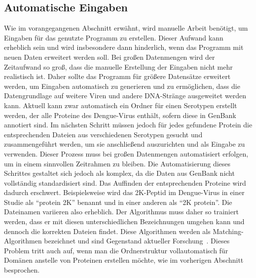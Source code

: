 \documentclass[german,version-2022-01]{uzl-thesis}
\begin{document}
\subsection{Automatische Eingaben}
Wie im vorangegangenen Abschnitt erw\"ahnt, wird manuelle Arbeit ben\"otigt, um Eingaben f\"ur das genutzte Programm zu erstellen. Dieser Aufwand kann erheblich sein und wird insbesondere dann hinderlich, wenn das Programm mit neuen Daten erweitert werden soll. Bei gro\ss{}en Datenmengen wird der Zeitaufwand so gro\ss{}, dass die manuelle Erstellung der Eingaben nicht mehr realistisch ist. Daher sollte das Programm f\"ur gr\"o\ss{}ere Datens\"atze erweitert werden, um Eingaben automatisch zu generieren und zu erm\"oglichen, dass die Datengrundlage auf weitere Viren und andere DNA-Str\"ange ausgeweitet werden kann. Aktuell kann zwar automatisch ein Ordner f\"ur einen Serotypen erstellt werden, der alle Proteine des Dengue-Virus enth\"alt, sofern diese in GenBank annotiert sind. Im n\"achsten Schritt m\"ussen jedoch f\"ur jedes gefundene Protein die entsprechenden Dateien aus verschiedenen Serotypen gesucht und zusammengef\"uhrt werden, um sie anschlie\ss{}end auszurichten und als Eingabe zu verwenden. Dieser Prozess muss bei gro\ss{}en Datenmengen automatisiert erfolgen, um in einem sinnvollen Zeitrahmen zu bleiben. Die Automatisierung dieses Schrittes gestaltet sich jedoch als komplex, da die Daten aus GenBank nicht vollst\"andig standardisiert sind. Das Auffinden der entsprechenden Proteine wird dadurch erschwert. Beispielsweise wird das 2K-Peptid im Dengue-Virus in einer Studie als "`protein 2K"' benannt und in einer anderen als "`2K protein"'. Die Dateinamen variieren also erheblich. Der Algorithmus muss daher so trainiert werden, dass er mit diesen unterschiedlichen Bezeichnungen umgehen kann und dennoch die korrekten Dateien findet. Diese Algorithmen werden als Matching-Algorithmen bezeichnet und sind Gegenstand aktueller Forschung~\cite{jurafsky2020speech, manning2008introduction, zhang2019survey}. Dieses Problem tritt auch auf, wenn man die Ordnerstruktur vollautomatisch f\"ur Dom\"anen anstelle von Proteinen erstellen m\"ochte, wie im vorherigen Abschnitt besprochen.
\end{document}
